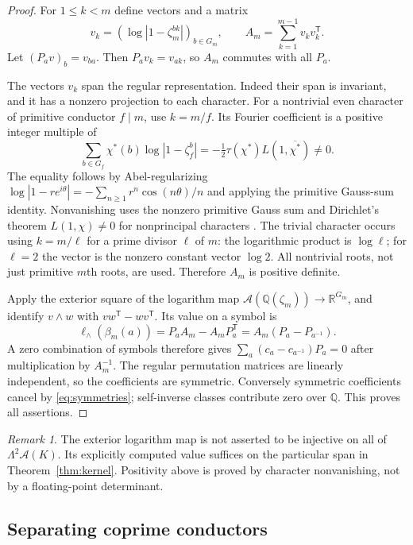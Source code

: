 \documentclass[11pt]{article}
\numberwithin{equation}{section}
\theoremstyle{definition}
\theoremstyle{remark}
\newtheorem{remark}[theorem]{Remark}
\newcommand{\Q}{\mathbb Q}
\newcommand{\R}{\mathbb R}
\newcommand{\A}{\mathcal A}
\newcommand{\inv}{^{-1}}
\begin{document}
\begin{proof}
For $1\le k<m$ define vectors and a matrix
\[
 v_k=(\log|1-\zeta_m^{bk}|)_{b\in G_m},
 \qquad A_m=\sum_{k=1}^{m-1}v_kv_k^{\mathsf T}.
\]
Let $(P_av)_b=v_{ba}$. Then $P_av_k=v_{ak}$, so $A_m$ commutes with
all $P_a$.

The vectors $v_k$ span the regular representation. Indeed their span
is invariant, and it has a nonzero projection to each character. For a
nontrivial even character of primitive conductor $f\mid m$, use
$k=m/f$. Its Fourier coefficient is a positive integer multiple of
\[
 \sum_{b\in G_f}\chi^*(b)\log|1-\zeta_f^b|
 =-\tfrac12\tau(\chi^*)L(1,\overline{\chi^*})\ne0.
\]
The equality follows by Abel-regularizing
$\log|1-r e^{i\theta}|=-\sum_{n\ge1}r^n\cos(n\theta)/n$ and applying
the primitive Gauss-sum identity. Nonvanishing uses the nonzero primitive
Gauss sum and Dirichlet's theorem $L(1,\chi)\ne0$ for nonprincipal
characters \cite[25.15.9]{DLMF}. The trivial character occurs using
$k=m/\ell$ for a prime divisor $\ell$ of $m$: the logarithmic product
is $\log\ell$; for $\ell=2$ the vector is the nonzero constant vector
$\log2$. All nontrivial roots, not just primitive $m$th roots, are used.
Therefore $A_m$ is positive definite.

Apply the exterior square of the logarithm map
$\A(\Q(\zeta_m))\to\R^{G_m}$, and identify $v\wedge w$ with
$vw^{\mathsf T}-wv^{\mathsf T}$. Its value on a symbol is
\begin{equation}\label{eq:skew-image}
 \ell_\wedge(\beta_m(a))
 =P_aA_m-A_mP_a^{\mathsf T}
 =A_m(P_a-P_{a\inv}).
\end{equation}
A zero combination of symbols therefore gives
$\sum_a(c_a-c_{a\inv})P_a=0$ after multiplication by $A_m^{-1}$.
The regular permutation matrices are linearly independent, so the
coefficients are symmetric. Conversely symmetric coefficients cancel
by \eqref{eq:symmetries}; self-inverse classes contribute zero over
$\Q$. This proves all assertions.
\end{proof}

\begin{remark}
The exterior logarithm map is not asserted to be injective on all of
$\Lambda^2\A(K)$. Its explicitly computed value suffices on the
particular span in Theorem~\ref{thm:kernel}. Positivity above is proved
by character nonvanishing, not by a floating-point determinant.
\end{remark}

\subsection{Separating coprime conductors}
\end{document}

